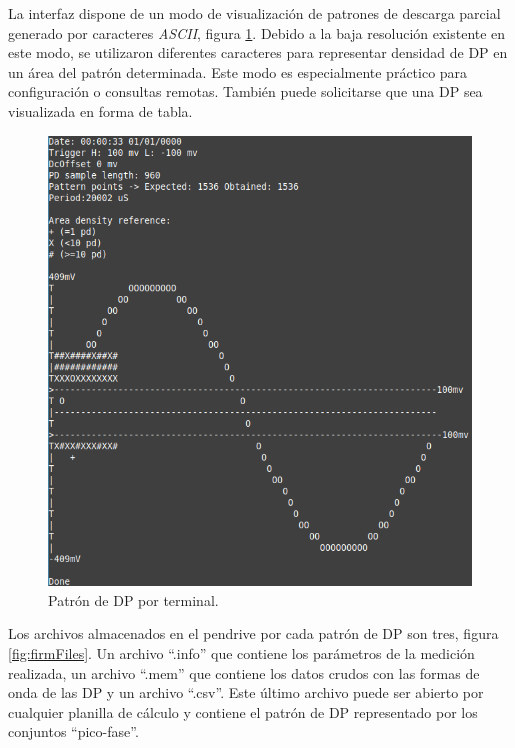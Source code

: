 \vspace{5mm}

La interfaz dispone de un modo de visualización de patrones de descarga parcial generado por caracteres \textit{ASCII}, figura \ref{fig:firmInterfaz}. Debido a la baja resolución existente en este modo, se utilizaron diferentes caracteres para representar densidad de DP en un área del patrón determinada. Este modo es especialmente práctico para configuración o consultas remotas. También puede solicitarse que una DP sea visualizada en forma de tabla.

\vspace{5mm}

\begin{figure}[ht]
	\centering
	\includegraphics[width=130mm]{./Figures/firmInterfaz.png}
	\caption{Patrón de DP por terminal.}
	\label{fig:firmInterfaz}
\end{figure}

Los archivos almacenados en el pendrive por cada patrón de DP son tres, figura \ref{fig:firmFiles}. Un archivo \enquote{.info} que contiene los parámetros de la medición realizada, un archivo \enquote{.mem} que contiene los datos crudos con las formas de onda de las DP y un archivo \enquote{.csv}. Este último archivo puede ser abierto por cualquier planilla de cálculo y contiene el patrón de DP representado por los conjuntos \enquote{pico-fase}.

